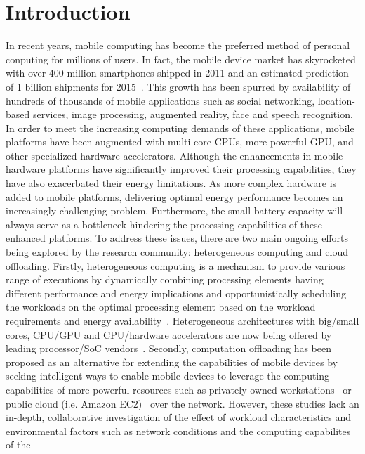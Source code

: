 \documentclass[conference]{IEEEtran}
\begin{document}
\IEEEpeerreviewmaketitle

\section{Introduction}
In recent years, mobile computing has become the preferred method of personal
conputing for millions of users.
%
In fact, the mobile device market has skyrocketed with over 400 million
smartphones shipped in 2011 and an estimated prediction of 1 billion
shipments for 2015~\cite{androidship}.
%
This growth has been spurred by availability of hundreds of thousands of mobile
applications such as social networking, location-based services, image
processing, augmented reality, face and speech recognition.
%
In order to meet the increasing computing demands of these applications,
mobile platforms have been augmented with
multi-core CPUs, more powerful GPU, and other specialized hardware
accelerators.
%
Although the enhancements in mobile hardware platforms have
significantly improved their processing capabilities, they have also
exacerbated their energy limitations.
%
As more complex hardware is added to mobile platforms, delivering
optimal energy performance becomes an increasingly challenging problem.
%
Furthermore, the small battery capacity will always serve as a
bottleneck hindering the processing capabilities of these enhanced
platforms.
%
To address these issues, there are two main ongoing efforts being
explored by the research community: heterogeneous computing and cloud offloading.
%
Firstly, heterogeneous computing is a mechanism to provide various
range of executions by dynamically combining processing elements having
different performance and energy implications and opportunistically
scheduling the workloads on the optimal processing element based on the
workload requirements and energy availability~\cite{optihetero}.
%
Heterogeneous architectures with big/small cores, CPU/GPU and
CPU/hardware accelerators are now being offered by leading processor/SoC
vendors~\cite{intel,amdcor}.
%  
Secondly, computation offloading has been proposed as an alternative for
extending the capabilities of mobile devices by seeking intelligent ways
to enable mobile devices to leverage the computing capabilities of more
powerful resources such as privately owned workstations~\cite{snarf} or
public cloud (i.e. Amazon EC2)~\cite{amazon} over the network.
%
However, these studies lack an in-depth, collaborative investigation of
the effect of workload characteristics and environmental factors
such as network conditions and the computing capabilites of the
\end{document}
